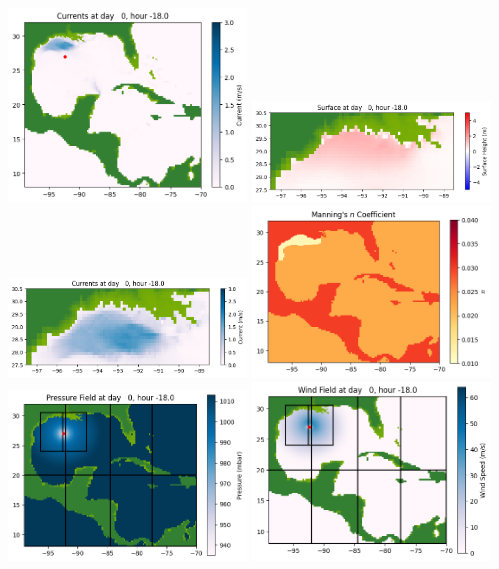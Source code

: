 \documentclass[11pt]{article}
\begin{document}
\includegraphics[width=0.475\textwidth]{frame0009fig1002.png}
\vskip 10pt 
\includegraphics[width=0.475\textwidth]{frame0009fig1003.png}
\includegraphics[width=0.475\textwidth]{frame0009fig1004.png}
\vskip 10pt 
\includegraphics[width=0.475\textwidth]{frame0009fig1005.png}
\includegraphics[width=0.475\textwidth]{frame0009fig1006.png}
\vskip 10pt 
\includegraphics[width=0.475\textwidth]{frame0009fig1007.png}
\end{document}
